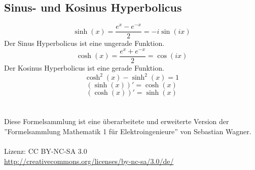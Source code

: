 \documentclass[a4paper,twocolumn,10pt]{article}
\begin{document}
\subsection{Sinus- und Kosinus Hyperbolicus}
\begin{equation*}
\sinh(x)=\frac{e^x-e^{-x}}{2}=-i\sin(ix)
\end{equation*}
Der Sinus Hyperbolicus ist eine ungerade Funktion.
\begin{equation*}
\cosh(x)=\frac{e^x+e^{-x}}{2}=\cos(ix)
\end{equation*}
Der Kosinus Hyperbolicus ist eine gerade Funktion.
\begin{equation*}
\cosh^2(x)-\sinh^2(x)=1
\end{equation*}
\begin{equation*}
(\sinh(x))'=\cosh(x)
\end{equation*}
\begin{equation*}
(\cosh(x))'=\sinh(x)
\end{equation*}
\\\\
Diese Formelsammlung ist eine überarbeitete und erweiterte Version der ''Formelsammlung Mathematik 1 für Elektroingenieure'' von Sebastian Wagner.\\\\
Lizenz: CC BY-NC-SA 3.0\\
\url{http://creativecommons.org/licenses/by-nc-sa/3.0/de/}
\end{document}
